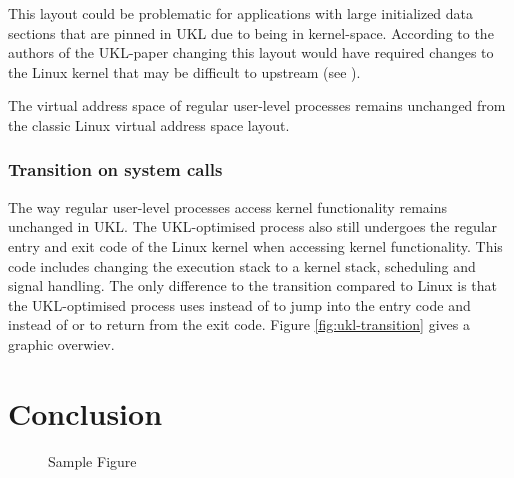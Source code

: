 \documentclass[10pt,twocolumn,a4paper]{article}
\begin{document}
      This layout could be problematic for applications with large initialized data sections
      that are pinned in UKL due to being in kernel-space.
      According to the authors of the UKL-paper changing this layout would have required changes
      to the Linux kernel that may be difficult to upstream (see ).

      The virtual address space of regular user-level processes remains unchanged from
      the classic Linux virtual address space layout.

    \subsubsection{Transition on system calls}
      The way regular user-level processes access kernel functionality remains unchanged in UKL.
      The UKL-optimised process also still undergoes the regular entry and exit code of
      the Linux kernel when accessing kernel functionality.
      This code includes changing the execution stack to a kernel stack, scheduling and signal handling.
      The only difference to the transition compared to Linux is that the UKL-optimised process uses
       instead of  to jump into the entry code and  instead
      of  or  to return from the exit code. 
      Figure \ref{fig:ukl-transition} gives a graphic overwiev.

      \begin{figure*}[hbt]
        \centering
        
        \caption{Transition between applications and kernel in UKL base model}
        \label{fig:ukl-transition}
      \end{figure*}



\section{Conclusion}\label{sec:conclusion}






\begin{figure}[htbp]
  \centering
  \caption{Sample Figure}
  \label{fig:sample}
\end{figure}
\end{document}
